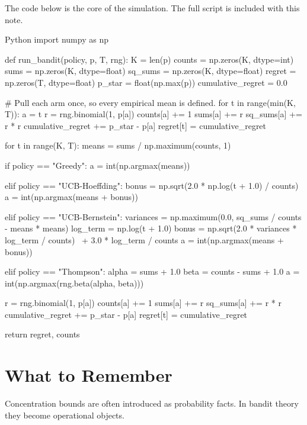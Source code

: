 \documentclass[en,nofont,11pt]{elegantbook}
\begin{document}
The code below is the core of the simulation. The full script is included with this note.

\begin{codeblock}[title={Core implementation used in the experiment.}]{Python}
import numpy as np

def run_bandit(policy, p, T, rng):
    K = len(p)
    counts = np.zeros(K, dtype=int)
    sums = np.zeros(K, dtype=float)
    sq_sums = np.zeros(K, dtype=float)
    regret = np.zeros(T, dtype=float)
    p_star = float(np.max(p))
    cumulative_regret = 0.0

    # Pull each arm once, so every empirical mean is defined.
    for t in range(min(K, T)):
        a = t
        r = rng.binomial(1, p[a])
        counts[a] += 1
        sums[a] += r
        sq_sums[a] += r * r
        cumulative_regret += p_star - p[a]
        regret[t] = cumulative_regret

    for t in range(K, T):
        means = sums / np.maximum(counts, 1)

        if policy == "Greedy":
            a = int(np.argmax(means))

        elif policy == "UCB-Hoeffding":
            bonus = np.sqrt(2.0 * np.log(t + 1.0) / counts)
            a = int(np.argmax(means + bonus))

        elif policy == "UCB-Bernstein":
            variances = np.maximum(0.0, sq_sums / counts - means * means)
            log_term = np.log(t + 1.0)
            bonus = np.sqrt(2.0 * variances * log_term / counts) \
                    + 3.0 * log_term / counts
            a = int(np.argmax(means + bonus))

        elif policy == "Thompson":
            alpha = sums + 1.0
            beta = counts - sums + 1.0
            a = int(np.argmax(rng.beta(alpha, beta)))

        r = rng.binomial(1, p[a])
        counts[a] += 1
        sums[a] += r
        sq_sums[a] += r * r
        cumulative_regret += p_star - p[a]
        regret[t] = cumulative_regret

    return regret, counts
\end{codeblock}

\chapter{What to Remember}

Concentration bounds are often introduced as probability facts. In bandit theory they become operational objects.
\end{document}
